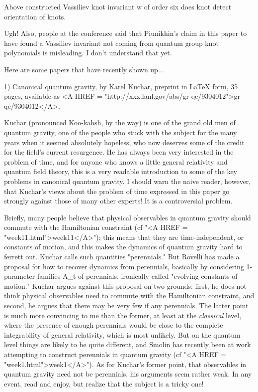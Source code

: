 Above constructed Vassiliev knot invariant w of order six does knot
detect orientation of knots.

Ugh!  Also, people at the conference said that Piunikhin's claim in this
paper to have found a Vassiliev invariant not coming from quantum group
knot polynomials is misleading.  I don't understand that yet.

Here are some papers that have recently shown up...

1) Canonical quantum gravity, by Karel Kuchar, preprint in LaTeX form,
35 pages, available as <A HREF = "http://xxx.lanl.gov/abs/gr-qc/9304012">gr-qc/9304012</A>.  

Kuchar (pronounced Koo-kahsh, by the way) is one of the grand old men of
quantum gravity, one of the people who stuck with the subject for the
many years when it seemed absolutely hopeless, who now deserves some of
the credit for the field's current resurgence.  He has always been very
interested in the problem of time, and for anyone who knows a little
general relativity and quantum field theory, this is a very readable
introduction to some of the key problems in canonical quantum gravity.
I should warn the naive reader, however, that Kuchar's views about the
problem of time expressed in this paper go strongly against those of
many other experts!  It is a controversial problem.  

Briefly, many people believe that physical observables in quantum
gravity should commute with the Hamiltonian constraint (cf "<A HREF = "week11.html">week11</A>");
this means that they are time-independent, or constants of motion, and
this makes the dynamics of quantum gravity hard to ferrett out.  Kuchar
calls such quantities "perennials."  But Rovelli has made a proposal for
how to recover dynamics from perennials, basically by considering 1-parameter
families A_t of perennials, ironically called "evolving constants of
motion."  Kuchar argues against this proposal on two grounds: first, he
does not think physical observables need to commute with the Hamiltonian
constraint, and second, he argues that there may be very few if any
perennials.  The latter point is much more convincing to me than the
former, at least at the \emph{classical} level, where the presence of enough
perennials would be close to the complete integrability of general
relativity, which is most unlikely.  But on the quantum level things are
likely to be quite different, and Smolin has recently been at work
attempting to construct perennials in quantum gravity (cf "<A HREF = "week1.html">week1</A>").  As
for Kuchar's former point, that observables in quantum gravity need not
be perennials, his arguments seem rather weak.  In any event, read and
enjoy, but realize that the subject is a tricky one!  

